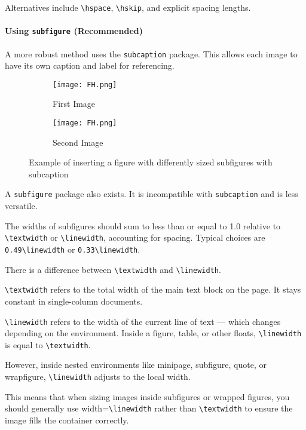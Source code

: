     Alternatives include \verb|\hspace|, \verb|\hskip|, and explicit spacing lengths.

    \paragraph{Using \texttt{subfigure} (Recommended)}

    A more robust method uses the \texttt{subcaption} package. This allows each image to have its own caption and label for referencing.

    \begin{figure}[H]
        \centering
        \begin{subfigure}{0.4\textwidth}
            \centering
            \texttt{[image: FH.png]}
            \caption{First Image}
            \label{fig:subfig1}
        \end{subfigure}
        \hfil
        \begin{subfigure}{0.55\textwidth}
            \centering
            \texttt{[image: FH.png]}
            \caption{Second Image}
            \label{fig:subfig2}
        \end{subfigure}
        \caption{Example of inserting a figure with differently sized subfigures with subcaption}
        \label{fig:ExampleFigure-4}
    \end{figure}

    \begin{warningbox}
        A \texttt{subfigure} package also exists. It is incompatible with \texttt{subcaption} and is less versatile.
    \end{warningbox}

    The widths of subfigures should sum to less than or equal to 1.0 relative to \verb|\textwidth| or \verb|\linewidth|, accounting for spacing. Typical choices are \verb|0.49\linewidth| or \verb|0.33\linewidth|.

    \begin{notebox}
        There is a difference between \verb|\textwidth| and \verb|\linewidth|.

        \verb|\textwidth| refers to the total width of the main text block on the page. It stays constant in single-column documents.

        \verb|\linewidth| refers to the width of the current line of text — which changes depending on the environment. Inside a figure, table, or other floats, \verb|\linewidth| is equal to \verb|\textwidth|.

        However, inside nested environments like minipage, subfigure, quote, or wrapfigure, \verb|\linewidth| adjusts to the local width.

        This means that when sizing images inside subfigures or wrapped figures, you should generally use width=\verb|\linewidth| rather than \verb|\textwidth| to ensure the image fills the container correctly.
    \end{notebox}

